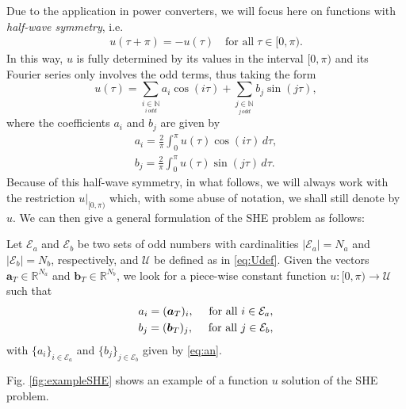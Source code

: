 Due to the application in power converters, we will focus here on functions with \textit{half-wave symmetry}, i.e. 
\begin{align*}
	u(\tau + \pi) = -u(\tau)\quad \mbox{for all}\; \tau \in [0,\pi).
\end{align*}
In this way, $u$ is fully determined by its values in the interval $[0,\pi)$ and its Fourier series only involves the odd terms, thus taking the form
\begin{equation}
	u(\tau ) = \sum_{\underset{i\, odd}{i \in \mathbb{N}}} a_i \cos(i\tau)+ \sum_{\underset{j\, odd}{j \in \mathbb{N}}}  b_j \sin(j \tau), 
\end{equation}
where the coefficients $a_i$ and $b_j$ are given by
\begin{equation} \label{eq:an}
	\begin{aligned}
		a_i = \frac{2}{\pi} \int_0^\pi u(\tau ) \cos(i \tau)\,d\tau, 
		\\
		b_j = \frac{2}{\pi} \int_0^\pi u(\tau)  \sin(j \tau)\,d\tau.
	\end{aligned}
\end{equation}
Because of this half-wave symmetry, in what follows, we will always work with the restriction $u|_{[0,\pi)}$ which, with some abuse of notation, we shall still denote by $u$. We can then give a general formulation of the SHE problem as follows:
\newline
\begin{problem}[SHE]\label{pb:SHEp}
Let $\mathcal{E} _a $ and $\mathcal{E} _b $ be two sets of odd numbers with cardinalities $|\mathcal{E}_a| = N_a $ and $ |\mathcal{E} _b| = N_b$, respectively, and $\mathcal{U}$ be defined as in \eqref{eq:Udef}. Given the vectors $\bm{a}_T \in \mathbb{R}^{N_a}$ and $\bm{b}_T \in \mathbb{R}^{N_b} $, we look for a piece-wise constant function $u: [0,\pi)\to\mathcal{U}$ such that 
\begin{gather}
	\notag a_i = (\bm{a}_T)_i, \quad\textrm{ for all } i \in \mathcal{E}_a,
	\\
	\notag b_j = (\bm {b}_T)_j, \quad\textrm{ for all } j \in \mathcal{E}_b,
\end{gather}
with $\{a_i\}_{i\in\mathcal E_a}$ and $\{b_j\}_{j\in\mathcal E_b}$ given by \eqref{eq:an}.
\end{problem} 
 
Fig. \ref{fig:exampleSHE} shows an example of a function $u$ solution of the SHE problem. 

